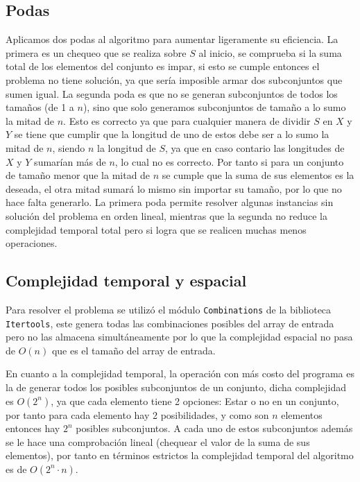 \documentclass[11pt]{article}
\begin{document}
    \subsection{Podas}
    Aplicamos dos podas al algoritmo para aumentar ligeramente su eficiencia. La primera es un chequeo que se realiza sobre $S$ al
    inicio, se comprueba si la suma total de los elementos del conjunto es impar, si esto se cumple entonces el problema no tiene
    solución, ya que sería imposible armar dos subconjuntos que sumen igual. La segunda poda es que no se generan subconjuntos de todos
    los tamaños (de 1 a $n$), sino que solo generamos subconjuntos de tamaño a lo sumo la mitad de $n$. Esto es correcto ya que para cualquier
    manera de dividir $S$ en $X$ y $Y$ se tiene que cumplir que la longitud de uno de estos debe ser a lo sumo la mitad de $n$, siendo $n$ la
    longitud de $S$, ya que en caso contario las longitudes de $X$ y $Y$ sumarían más de $n$, lo cual no es correcto. Por tanto si para un conjunto
    de tamaño menor que la mitad de $n$ se cumple que la suma de sus elementos es la deseada, el otra mitad sumará lo mismo sin importar
    su tamaño, por lo que no hace falta generarlo. La primera poda permite resolver algunas instancias sin solución del problema
    en orden lineal, mientras que la segunda no reduce la complejidad temporal total pero si logra que se realicen muchas menos
    operaciones.

    \subsection{Complejidad temporal y espacial}
    Para resolver el problema se utilizó el módulo \texttt{Combinations} de la biblioteca \texttt{Itertools}, este genera todas
    las combinaciones posibles del array de entrada pero no las almacena simultáneamente por lo que la complejidad espacial no pasa 
    de $O(n)$ que es el tamaño del array de entrada.

    En cuanto a la complejidad temporal, la operación con más costo del programa es la de generar todos los posibles subconjuntos de
    un conjunto, dicha complejidad es $O(2^n)$, ya que cada elemento tiene 2 opciones: Estar o no en un conjunto, por tanto
    para cada elemento hay 2 posibilidades, y como son $n$ elementos entonces hay $2^n$ posibles subconjuntos. A cada uno de estos
    subconjuntos además se le hace una comprobación lineal (chequear el valor de la suma de sus elementos), por tanto en términos
    estrictos la complejidad temporal del algoritmo es de $O(2^n \cdot n)$. 
    
\end{document}
